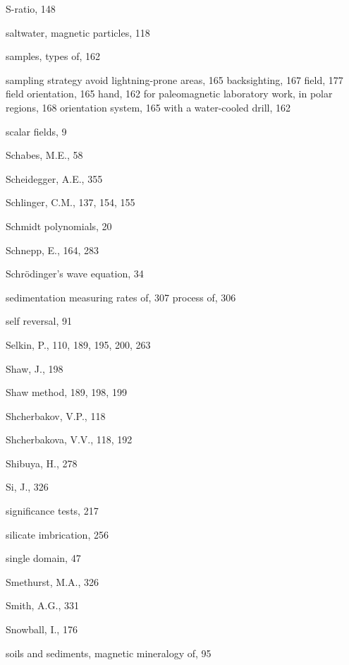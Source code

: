 \documentclass[,plain]{tauxe}
\begin{document}
\begin{theindex}
  \item S-ratio, 148
  \item saltwater, magnetic particles, 118
  \item samples,  types of, 162
  \item sampling strategy
    \subitem avoid lightning-prone areas, 165
    \subitem backsighting, 167
    \subitem field, 177
    \subitem field orientation, 165
    \subitem hand, 162
	\subitem for paleomagnetic laboratory work,
    \subitem in polar regions, 168
    \subitem orientation system, 165
    \subitem with a water-cooled drill, 162
  \item scalar fields, 9
  \item Schabes, M.E., 58
  \item Scheidegger, A.E., 355
  \item Schlinger, C.M., 137, 154, 155
  \item Schmidt polynomials, 20
  \item Schnepp, E., 164, 283
  \item Schr\"odinger's wave equation, 34
  \item sedimentation 
	\subitem measuring rates of, 307
	\subitem  process of, 306
  \item self reversal, 91
  \item Selkin, P., 110, 189, 195, 200, 263
  \item Shaw, J., 198
  \item Shaw method, 189, 198, 199
  \item Shcherbakov, V.P., 118
  \item Shcherbakova, V.V., 118, 192
  \item Shibuya, H., 278
  \item Si, J., 326
  \item significance tests, 217
  \item silicate imbrication, 256
  \item single domain, 47
  \item Smethurst, M.A., 326
  \item Smith, A.G., 331
  \item Snowball, I., 176
  \item soils and sediments,
    \subitem magnetic mineralogy of, 95

\end{theindex}
\end{document}
